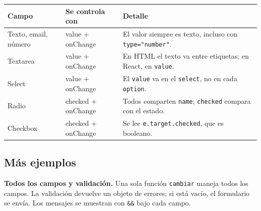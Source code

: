 \documentclass[11pt,a4paper]{article}
\newcommand{\cmd}[1]{\texttt{\color{reactdark}#1}}
\begin{document}
\begin{center}
\small
\begin{tabular}{l >{\ttfamily}p{4.4cm} p{5.5cm}}
\toprule
\textbf{Campo} & \textrm{\textbf{Se controla con}} & \textbf{Detalle} \\
\midrule
Texto, email, número & value + onChange & El valor siempre es texto, incluso con \cmd{type="number"}. \\
Textarea & value + onChange & En HTML el texto va entre etiquetas; en React, en \cmd{value}. \\
Select & value + onChange & El \cmd{value} va en el \cmd{select}, no en cada \cmd{option}. \\
Radio & checked + onChange & Todos comparten \cmd{name}; \cmd{checked} compara con el estado. \\
Checkbox & checked + onChange & Se lee \cmd{e.target.checked}, que es booleano. \\
\bottomrule
\end{tabular}
\end{center}

\subsection{Más ejemplos}

\textbf{Todos los campos y validación.} Una sola función \cmd{cambiar} maneja todos los campos. La validación devuelve un objeto de errores; si está vacío, el formulario se envía. Los mensajes se muestran con \cmd{\&\&} bajo cada campo.
\end{document}
